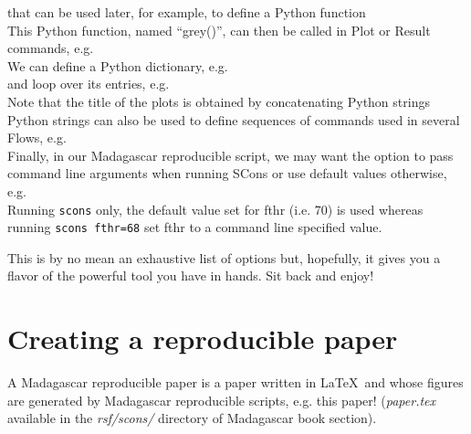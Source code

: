 \noindent that can be used later, for example, to define a Python function\\



This Python function, named ``grey()'', can then be called in Plot or Result
commands, e.g.\\



We can define a Python dictionary, e.g.\\



\noindent and loop over its entries, e.g.\\



Note that the title of the plots is obtained by concatenating Python
strings\\



Python strings can also be used to define sequences of commands used
in several Flows, e.g.\\



Finally, in our Madagascar reproducible script, we may want the option
to pass command line arguments when running SCons or use default
values otherwise, e.g.\\



Running \texttt{scons} only, the default value set for fthr (i.e. 70)
is used whereas running \texttt{scons fthr=68} set fthr to a command
line specified value.

This is by no mean an exhaustive list of options but, hopefully, it
gives you a flavor of the powerful tool you have in hands. Sit back
and enjoy!

\section{Creating a reproducible paper}

A Madagascar reproducible paper is a paper written in \LaTeX\ and
whose figures are generated by Madagascar reproducible scripts, e.g.
this paper!  (\textit{paper.tex} available in the \textit{rsf/scons/}
directory of Madagascar book section).

